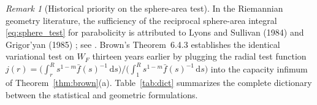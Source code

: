 \documentclass[a4paper,11pt,noarxiv]{quantumarticle}
\newcommand{\dd}{\,\mathrm{d}}
\newcommand{\fbar}{\bar f}
\theoremstyle{plain}
\theoremstyle{definition}
\theoremstyle{remark}
\newtheorem{remark}[theorem]{Remark}
\begin{document}
\begin{remark}[Historical priority on the sphere-area test]
In the Riemannian geometry literature, the sufficiency of the
reciprocal sphere-area integral \eqref{eq:sphere_test} for parabolicity
is attributed to Lyons and Sullivan (1984) \cite{lyonssullivan1984} and
Grigor'yan (1985) \cite{grigoryan1985}; see \cite[p.~178]{grigoryan1999}.
Brown's Theorem~6.4.3 \cite{brown1971} establishes the identical
variational test on $W_F$ thirteen years earlier by plugging the radial
test function $j(r)=\big(\int_r^R s^{1-m}\fbar(s)^{-1}\dd s\big)\big/
\big(\int_1^R s^{1-m}\fbar(s)^{-1}\dd s\big)$ into the capacity
infimum of Theorem~\ref{thm:brown}(a). Table~\ref{tab:dict} summarizes
the complete dictionary between the statistical and geometric
formulations.
\end{remark}
\end{document}
